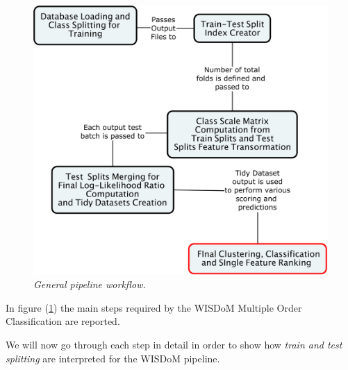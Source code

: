 \documentclass[12pt,openright,twoside,a4paper]{book}
\begin{document}
\begin{figure}[!h]
\centering
\includegraphics[scale=0.3]{General-Pipeline}
\caption{\textit{General pipeline workflow.}}
\label{gpipe}
\end{figure}

In figure (\ref{gpipe}) the main steps required by the WISDoM Multiple Order Classification are reported.

We will now go through each step in detail in order to show how \textit{train and test splitting} are interpreted for the WISDoM pipeline.
\end{document}
